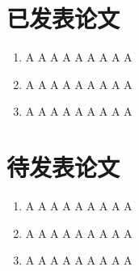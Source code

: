 
\begin{publications}

\section*{已发表论文}

\begin{enumerate}
\item A A A A A A A A A
\item A A A A A A A A A
\item A A A A A A A A A
\end{enumerate}

\section*{待发表论文}

\begin{enumerate}
\item A A A A A A A A A
\item A A A A A A A A A
\item A A A A A A A A A
\end{enumerate}


\end{publications}
